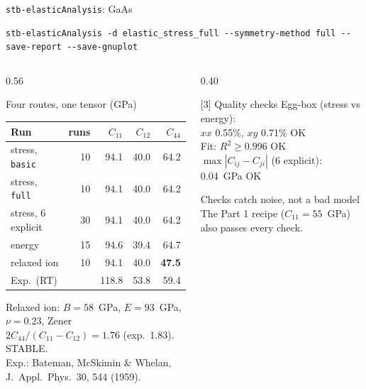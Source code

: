 \documentclass[8pt]{beamer}
\begin{document}
\begin{frame}[fragile]{\texttt{stb-elasticAnalysis}: GaAs}
	\relax
	{\scriptsize
\begin{verbatim}
stb-elasticAnalysis -d elastic_stress_full --symmetry-method full --save-report --save-gnuplot
\end{verbatim}
	}
	\begin{columns}[T]
		\begin{column}{0.56\textwidth}
			\begin{block}{Four routes, one tensor (GPa)}
				\centering\scriptsize
				\setlength{\tabcolsep}{4pt}
				\begin{tabular}{lrrrr}
					\toprule
					Run & runs & $C_{11}$ & $C_{12}$ & $C_{44}$ \\
					\midrule
					stress, \texttt{basic} & 10 & 94.1 & 40.0 & 64.2 \\
					stress, \texttt{full} & 10 & 94.1 & 40.0 & 64.2 \\
					stress, 6 explicit & 30 & 94.1 & 40.0 & 64.2 \\
					energy & 15 & 94.6 & 39.4 & 64.7 \\
					\midrule
					relaxed ion & 10 & 94.1 & 40.0 & \textbf{47.5} \\
					Exp.\ (RT) & & 118.8 & 53.8 & 59.4 \\
					\bottomrule
				\end{tabular}
			\end{block}
			{\scriptsize Relaxed ion: $B = 58$~GPa, $E = 93$~GPa, $\nu = 0.23$,
			Zener $2C_{44}/(C_{11}-C_{12}) = 1.76$ (exp.\ 1.83). STABLE.\\
			Exp.: Bateman, McSkimin \& Whelan, J.\ Appl.\ Phys.\ 30, 544 (1959).}
		\end{column}
		\begin{column}{0.40\textwidth}
			\begin{block}{[3] Quality checks}
				\scriptsize
				Egg-box (stress vs energy):\\ $xx$ 0.55\%, $xy$ 0.71\% \hfill OK\\[2pt]
				Fit: $R^2 \ge 0.996$ \hfill OK\\[2pt]
				$\max|C_{ij}-C_{ji}|$ (6 explicit): 0.04~GPa \hfill OK
			\end{block}
			\begin{alertblock}{Checks catch noise, not a bad model}
				The Part 1 recipe ($C_{11}=55$~GPa) also passes every check.
			\end{alertblock}
		\end{column}
	\end{columns}
\end{frame}
\end{document}
